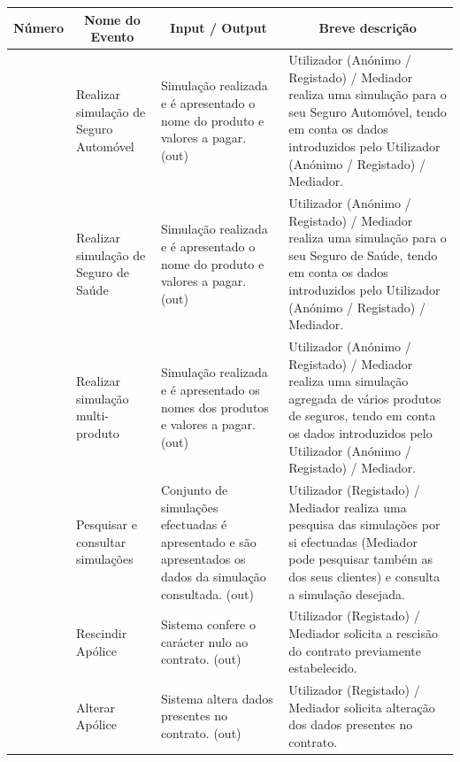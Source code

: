 \pagebreak
\begin{table}[!htb]
	\begin{center}
		\begin{tabular}{|c|p{3cm}|p{3cm}|p{5cm}|}
		\hline
		\multicolumn{1}{|c|}{\textbf{Número}} & \multicolumn{1}{|c|}{\textbf{Nome do Evento}} & \multicolumn{1}{|c|}{\textbf{Input / Output}} & \multicolumn{1}{|c|}{\textbf{Breve descrição}}\\
		\hline
		\T \B 1 & \scriptsize{Realizar simulação de Seguro Automóvel} & \scriptsize{Simulação realizada e é apresentado o nome do produto e valores a pagar. (out)} & \scriptsize{Utilizador (Anónimo / Registado) / Mediador realiza uma simulação para o seu Seguro Automóvel, tendo em conta os dados introduzidos pelo Utilizador (Anónimo / Registado) / Mediador.}\\
		\hline
		\T \B 2 & \scriptsize{Realizar simulação de Seguro de Saúde} & \scriptsize{Simulação realizada e é apresentado o nome do produto e valores a pagar. (out)} & \scriptsize{Utilizador (Anónimo / Registado) / Mediador realiza uma simulação para o seu Seguro de Saúde, tendo em conta os dados introduzidos pelo Utilizador (Anónimo / Registado) / Mediador.}\\
		\hline
		\T \B 3 & \scriptsize{Realizar simulação multi-produto} & \scriptsize{Simulação realizada e é apresentado os nomes dos produtos e valores a pagar. (out)} & \scriptsize{Utilizador (Anónimo / Registado) / Mediador realiza uma simulação agregada de vários produtos de seguros, tendo em conta os dados introduzidos pelo Utilizador (Anónimo / Registado) / Mediador.}\\
		\hline
		\T \B 4 & \scriptsize{Pesquisar e consultar simulações} & \scriptsize{Conjunto de simulações efectuadas é apresentado e são apresentados os dados da simulação consultada. (out)} & \scriptsize{Utilizador (Registado) / Mediador realiza uma pesquisa das simulações por si efectuadas (Mediador pode pesquisar também as dos seus clientes) e consulta a simulação desejada.}\\
		\hline
		\T \B 5 & \scriptsize{Rescindir Apólice} & \scriptsize{Sistema confere o carácter nulo ao contrato. (out)} & \scriptsize{Utilizador (Registado) / Mediador solicita a rescisão do contrato previamente estabelecido.}\\
		\hline
		\T \B 6 & \scriptsize{Alterar Apólice} & \scriptsize{Sistema altera dados presentes no contrato. (out)} & \scriptsize{Utilizador (Registado) / Mediador solicita alteração dos dados presentes no contrato.}\\

\end{tabular}
\end{center}
\end{table}
